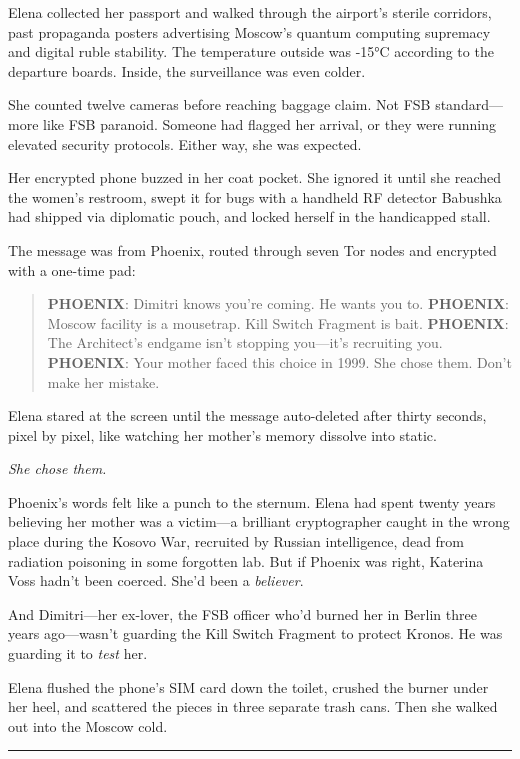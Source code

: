 \documentclass[12pt,letterpaper]{book}
\begin{document}
Elena collected her passport and walked through the airport's sterile corridors, past propaganda posters advertising Moscow's quantum computing supremacy and digital ruble stability. The temperature outside was -15°C according to the departure boards. Inside, the surveillance was even colder.

She counted twelve cameras before reaching baggage claim. Not FSB standard---more like FSB paranoid. Someone had flagged her arrival, or they were running elevated security protocols. Either way, she was expected.

Her encrypted phone buzzed in her coat pocket. She ignored it until she reached the women's restroom, swept it for bugs with a handheld RF detector Babushka had shipped via diplomatic pouch, and locked herself in the handicapped stall.

The message was from Phoenix, routed through seven Tor nodes and encrypted with a one-time pad:

\begin{quote}
\textbf{PHOENIX}: Dimitri knows you're coming. He wants you to. \textbf{PHOENIX}: Moscow facility is a mousetrap. Kill Switch Fragment is bait. \textbf{PHOENIX}: The Architect's endgame isn't stopping you---it's recruiting you. \textbf{PHOENIX}: Your mother faced this choice in 1999. She chose them. Don't make her mistake.
\end{quote}

Elena stared at the screen until the message auto-deleted after thirty seconds, pixel by pixel, like watching her mother's memory dissolve into static.

\emph{She chose them.}

Phoenix's words felt like a punch to the sternum. Elena had spent twenty years believing her mother was a victim---a brilliant cryptographer caught in the wrong place during the Kosovo War, recruited by Russian intelligence, dead from radiation poisoning in some forgotten lab. But if Phoenix was right, Katerina Voss hadn't been coerced. She'd been a \emph{believer}.

And Dimitri---her ex-lover, the FSB officer who'd burned her in Berlin three years ago---wasn't guarding the Kill Switch Fragment to protect Kronos. He was guarding it to \emph{test} her.

Elena flushed the phone's SIM card down the toilet, crushed the burner under her heel, and scattered the pieces in three separate trash cans. Then she walked out into the Moscow cold.

\begin{center}\rule{0.5\linewidth}{0.5pt}\end{center}
\end{document}
